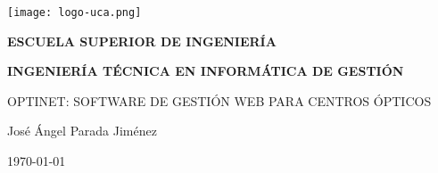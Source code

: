 


\begin{titlepage}

  \begin{center}

    \texttt{[image: logo-uca.png]} \\
    
    \vspace{2.5cm}
    
    \LARGE{\textbf{ESCUELA SUPERIOR DE INGENIERÍA}} \\
    
    \vspace{1.0cm}
    
    \Large{\textbf{INGENIERÍA TÉCNICA EN INFORMÁTICA DE GESTIÓN}} \\
    
    \vspace{3.0cm}
    
    \Large{OPTINET: SOFTWARE DE GESTIÓN WEB PARA CENTROS ÓPTICOS} \\
    
    \vspace{2.5cm}
    
    \Large{José Ángel Parada Jiménez} \\
  
    \vspace{0.5cm}

    \large{\today}
    
  \end{center}
\end{titlepage}
